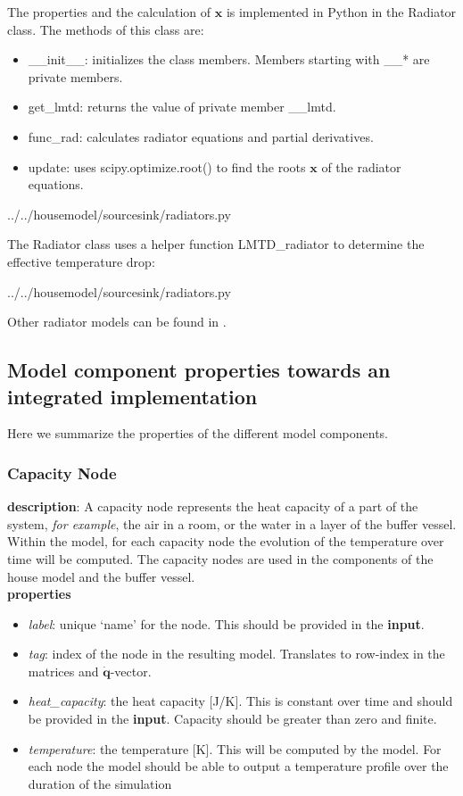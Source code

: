 The properties and the calculation of $\mathbf{x}$ is implemented in Python in the \textsf{Radiator} class.
The methods of this class are:
\begin{itemize}
	\item \textsf{\_\_init\_\_}: initializes the class members. Members starting with \_\_* are private members.
	\item \textsf{get\_lmtd}: returns the value of private member \_\_lmtd.
	\item \textsf{func\_rad}: calculates radiator equations and partial derivatives.
	\item \textsf{update}: uses \textsf{scipy.optimize.root()} to find the roots $\mathbf{x}$ of the radiator equations.
\end{itemize}

 
{../../housemodel/sourcesink/radiators.py}

The Radiator class uses a helper function \textsf{LMTD\_radiator} to determine the effective temperature drop:

 
{../../housemodel/sourcesink/radiators.py}

Other radiator models can be found in \cite{TolRadiator}.

\subsection{Model component properties towards an integrated implementation}
Here we summarize the properties of the different model components. 

\subsubsection{Capacity Node}

\textbf{description}: A capacity node represents the heat capacity of a part of the system, \textit{for example}, the air in a room, or the water in a layer of the buffer vessel. Within the model, for each capacity node the evolution of the temperature over time will be computed. The capacity nodes are used in the components of the house model and the buffer vessel. 
\\
\textbf{properties}

\begin{itemize}
	\item \emph{label}: unique `name' for the node. This should be provided in the \textbf{input}.
	\item \emph{tag}: index of the node in the resulting model. Translates to row-index in the matrices and $\mathbf{\dot{q}}$-vector.
	\item \emph{heat\_capacity}: the heat capacity [J/K]. This is constant over time and should be provided in the \textbf{input}. Capacity should be greater than zero and finite.  
	\item \emph{temperature}: the temperature [K]. This will be computed by the model. For each node the model should be able to output a temperature profile over the duration of the simulation
\end{itemize}

